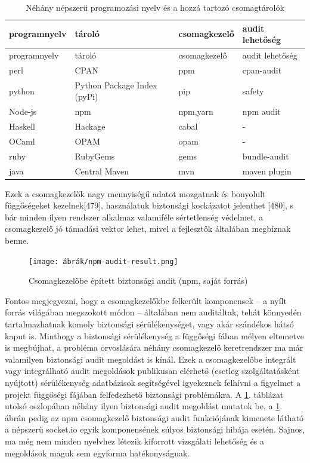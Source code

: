 \documentclass[12pt,magyar,a4paper,oneside]{scrreprt}
\begin{document}
\hypertarget{tbl:repos}{}
\begin{longtable}[]{@{}llll@{}}
\caption{\label{tbl:repos}Néhány népszerű programozási nyelv és a hozzá
tartozó csomagtárolók}\tabularnewline
\toprule
programnyelv & tároló & csomagkezelő & audit lehetőség\tabularnewline
\midrule
\endfirsthead
\toprule
programnyelv & tároló & csomagkezelő & audit lehetőség\tabularnewline
\midrule
\endhead
perl & CPAN & ppm & cpan-audit\tabularnewline
python & Python Package Index (pyPi) & pip & safety\tabularnewline
Node-js & npm & npm,yarn & npm audit\tabularnewline
Haskell & Hackage & cabal & -\tabularnewline
OCaml & OPAM & opam & -\tabularnewline
ruby & RubyGems & gems & bundle-audit\tabularnewline
java & Central Maven & mvn & maven plugin\tabularnewline
\bottomrule
\end{longtable}

Ezek a csomagkezelők nagy mennyiségű adatot mozgatnak és bonyolult
függőségeket kezelnek{[}479{]}, használatuk biztonsági kockázatot
jelenthet {[}480{]}, s bár minden ilyen rendszer alkalmaz valamiféle
sértetlenség védelmet, a csomagkezelő jó támadási vektor lehet, mivel a
fejlesztők általában megbíznak benne.

\begin{figure}
\hypertarget{fig:NPM-audit}{%
\centering
\texttt{[image: ábrák/npm-audit-result.png]}
\caption{Csomagkezelőbe épített biztonsági audit (npm, saját
forrás)}\label{fig:NPM-audit}
}
\end{figure}

Fontos megjegyezni, hogy a csomagkezelőkbe felkerült komponensek -- a
nyílt forrás világában megszokott módon -- általában nem auditáltak,
tehát könnyedén tartalmazhatnak komoly biztonsági sérülékenységet, vagy
akár szándékos hátsó kaput is. Minthogy a biztonsági sérülékenység a
függőségi fában mélyen eltemetve is megbújhat, a probléma orvoslására
néhány csomagkezelő keretrendszer ma már valamilyen biztonsági audit
megoldást is kínál. Ezek a csomagkezelőbe integrált vagy integrálható
audit megoldások publikusan elérhető (esetleg szolgáltatásként nyújtott)
sérülékenység adatbázisok segítségével igyekeznek felhívni a figyelmet a
projekt függőségi fájában felfedezhető biztonsági problémákra. A
\ref{tbl:repos}. táblázat utolsó oszlopában néhány ilyen biztonsági
audit megoldást mutatok be, a \ref{fig:NPM-audit}. ábrán pedig az npm
csomagkezelő biztonsági audit funkciójának kimenete látható a népszerű
socket.io egyik komponensének súlyos biztonsági hibája esetén. Sajnos,
ma még nem minden nyelvhez létezik kiforrott vizsgálati lehetőség és a
megoldások maguk sem egyforma hatékonyságuak.
\end{document}
